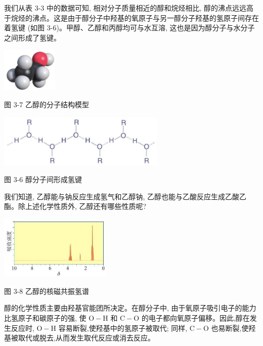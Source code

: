\documentclass[10pt]{article}
\begin{document}
我们从表 3-3 中的数据可知, 相对分子质量相近的醇和烷烃相比, 醇的沸点远远高于烷烃的沸点。这是由于醇分子中羟基的氧原子与另一醇分子羟基的氢原子间存在着氢键 (如图 3-6)。甲醇、乙醇和丙醇均可与水互溶, 这也是因为醇分子与水分子之间形成了氢键。

\begin{center}
\includegraphics[max width=0.2\textwidth]{images/0190efc5-b58a-7c43-bfb0-e0a030df9cfd_66_362213.jpg}
\end{center}

图 3-7 乙醇的分子结构模型

\begin{center}
\includegraphics[max width=0.6\textwidth]{images/0190efc5-b58a-7c43-bfb0-e0a030df9cfd_66_835200.jpg}
\end{center}

图 3-6 醇分子间形成氢键

我们知道, 乙醇能与钠反应生成氢气和乙醇钠, 乙醇也能与乙酸反应生成乙酸乙酯。除上述化学性质外, 乙醇还有哪些性质呢?

\begin{center}
\includegraphics[max width=0.4\textwidth]{images/0190efc5-b58a-7c43-bfb0-e0a030df9cfd_66_459383.jpg}
\end{center}

图 3-8 乙醇的核磁共振氢谱

醇的化学性质主要由羟基官能团所决定。在醇分子中, 由于氧原子吸引电子的能力比氢原子和碳原子的强, 使 \(\mathrm{O} - \mathrm{H}\) 和 \(\mathrm{C} - \mathrm{O}\) 的电子都向氧原子偏移。因此,醇在发生反应时, \(\mathrm{O} - \mathrm{H}\) 容易断裂,使羟基中的氢原子被取代; 同样, \(\mathrm{C} - \mathrm{O}\) 也易断裂,使羟基被取代或脱去,从而发生取代反应或消去反应。
\end{document}
